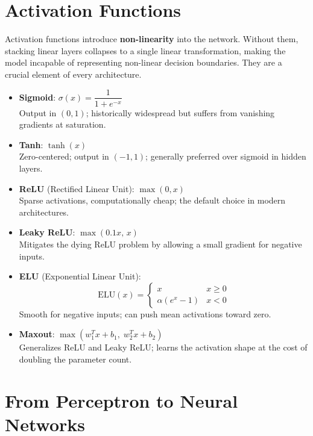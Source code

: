\documentclass[11pt,a4paper]{article}
\theoremstyle{definition}
\theoremstyle{plain}
\theoremstyle{remark}
\begin{document}
\section{Activation Functions}

Activation functions introduce \textbf{non-linearity} into the network. Without them, stacking linear layers collapses to a single linear transformation, making the model incapable of representing non-linear decision boundaries. They are a crucial element of every architecture.

\begin{itemize}
    \item \textbf{Sigmoid}: $\sigma(x) = \dfrac{1}{1+e^{-x}}$\\
        Output in $(0,1)$; historically widespread but suffers from vanishing gradients at saturation.

    \item \textbf{Tanh}: $\tanh(x)$\\
        Zero-centered; output in $(-1,1)$; generally preferred over sigmoid in hidden layers.

    \item \textbf{ReLU} (Rectified Linear Unit): $\max(0, x)$\\
        Sparse activations, computationally cheap; the default choice in modern architectures.

    \item \textbf{Leaky ReLU}: $\max(0.1x,\, x)$\\
        Mitigates the dying ReLU problem by allowing a small gradient for negative inputs.

    \item \textbf{ELU} (Exponential Linear Unit):
    \[
        \mathrm{ELU}(x) = \begin{cases} x & x \geq 0 \\ \alpha(e^x - 1) & x < 0 \end{cases}
    \]
    Smooth for negative inputs; can push mean activations toward zero.

    \item \textbf{Maxout}: $\max(w_1^T x + b_1,\; w_2^T x + b_2)$\\
        Generalizes ReLU and Leaky ReLU; learns the activation shape at the cost of doubling the parameter count.
\end{itemize}


\section{From Perceptron to Neural Networks}
\end{document}
